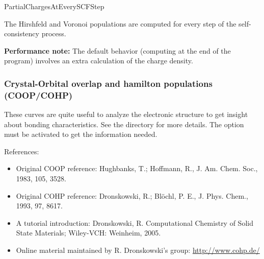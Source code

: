 \begin{fdflogicalF}{PartialChargesAtEverySCFStep}

  The Hirshfeld and Voronoi populations are computed for every step of
  the self-consistency process.

\end{fdflogicalF}

\textbf{Performance note:}
The default behavior (computing at the end of the program) involves
an extra calculation of the charge density.



\subsubsection{Crystal-Orbital overlap and hamilton populations (COOP/COHP)}
\label{sec:coop}

These curves are quite useful to analyze the electronic structure to
get insight about bonding characteristics. See the 
directory for more details. The  option must be
activated to get the information needed.

References:
\begin{itemize}
  \item%
  Original COOP reference:
  Hughbanks, T.; Hoffmann, R., J. Am. Chem. Soc., 1983, 105, 3528.

  \item%
  Original COHP reference: Dronskowski, R.; Blöchl, P. E., J. Phys. Chem., 1993, 97, 8617.

  \item%
  A tutorial introduction: Dronskowski, R. Computational Chemistry of Solid State
  Materials; Wiley-VCH: Weinheim, 2005.

  \item%
  Online material maintained by R. Dronskowski's group: \url{http://www.cohp.de/}
\end{itemize}


